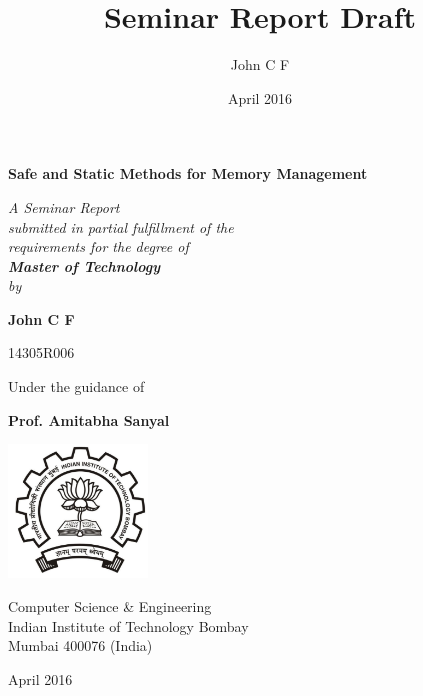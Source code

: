 \documentclass[11pt]{report}
\title{Seminar Report Draft}
\author{John C F}
\date{April 2016}
\begin{document}
\begin{titlepage}
    \begin{center}
        {\LARGE \bfseries Safe and Static Methods for Memory Management \par}
        { \large \em {} 
            A Seminar Report \\ [.25\baselineskip] 
            submitted in partial fulfillment of the \\ [.25\baselineskip] 
            requirements for the degree of \\ [.25\baselineskip] 
            { \bfseries  Master of Technology } \\ [.5\baselineskip] 
            by \par
        }
        {\large \bfseries John C F\par}
        \vspace{.25\baselineskip}
        {\large 14305R006}

        {\large Under the guidance of\par}\vspace{.25\baselineskip}
        {\large \bfseries Prof. Amitabha Sanyal \par}

        \includegraphics[width=10em]{iitb-black}

        {
            {\large Computer Science \& Engineering\\[0.25\baselineskip]
                Indian Institute of Technology Bombay \\[0.25\baselineskip]
                Mumbai 400076  (India) }
            \\[0.5\baselineskip]
            {\large April 2016 \par}
        }
    \end{center}
\end{titlepage}
\end{document}
